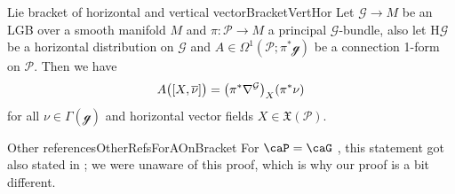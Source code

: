 \documentclass[reqno,a4paper,oneside]{amsart}
\newcommand{\e}{\ensuremath{\mathrm{e\;\!}}}
\theoremstyle{plain}
\theoremstyle{remark}
\theoremstyle{definition}
\begin{document}
\begin{lemmata}{Lie bracket of horizontal and vertical vector}{BracketVertHor}
Let $\mathcal{G} \to M$ be an LGB over a smooth manifold $M$ and $\pi\colon\mathcal{P} \to M$ a principal $\mathcal{G}$-bundle, also let $\mathrm{H}\mathcal{G}$ be a horizontal distribution on $\mathcal{G}$ and $A \in \Omega^1(\mathcal{P}; \pi^*\mathcal{g})$ be a connection 1-form on $\mathcal{P}$. Then we have
%
\begin{equation*}
A\bigl( \mleft[ X, \overline{\nu} \mright] \bigr)
=
\mleft( \pi^*\nabla^{\mathcal{G}} \mright)_{X}(\pi^*\nu)
\end{equation*}
for all $\nu \in \Gamma(\mathcal{g})$ and horizontal vector fields $X \in \mathfrak{X}(\mathcal{P})$.
\end{lemmata}

\begin{remarks}{Other references}{OtherRefsForAOnBracket}
For $\caP = \caG$ , this statement got also stated in \cite[Eq.\ (2.8)]{FernandesMarcutMultiplicativeForms}; we were unaware of this proof, which is why our proof is a bit different.
\end{remarks}
\end{document}
